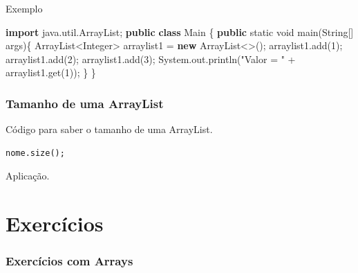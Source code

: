 \documentclass[
]{book}
\newenvironment{Shaded}{\begin{snugshade}}{\end{snugshade}}
\newcommand{\BuiltInTok}[1]{#1}
\newcommand{\DataTypeTok}[1]{\textcolor[rgb]{0.13,0.29,0.53}{#1}}
\newcommand{\DecValTok}[1]{\textcolor[rgb]{0.00,0.00,0.81}{#1}}
\newcommand{\FunctionTok}[1]{\textcolor[rgb]{0.00,0.00,0.00}{#1}}
\newcommand{\ImportTok}[1]{#1}
\newcommand{\KeywordTok}[1]{\textcolor[rgb]{0.13,0.29,0.53}{\textbf{#1}}}
\newcommand{\NormalTok}[1]{#1}
\newcommand{\StringTok}[1]{\textcolor[rgb]{0.31,0.60,0.02}{#1}}
\begin{document}
Exemplo

\begin{Shaded}
\begin{Highlighting}[]
\KeywordTok{import}\ImportTok{ java.util.ArrayList;}
\KeywordTok{public} \KeywordTok{class}\NormalTok{ Main \{}
    \KeywordTok{public} \DataTypeTok{static} \DataTypeTok{void} \FunctionTok{main}\NormalTok{(}\BuiltInTok{String}\NormalTok{[] args)\{}
        \BuiltInTok{ArrayList}\NormalTok{<}\BuiltInTok{Integer}\NormalTok{> arraylist1 = }\KeywordTok{new} \BuiltInTok{ArrayList}\NormalTok{<>();}
\NormalTok{        arraylist1.}\FunctionTok{add}\NormalTok{(}\DecValTok{1}\NormalTok{);}
\NormalTok{        arraylist1.}\FunctionTok{add}\NormalTok{(}\DecValTok{2}\NormalTok{);}
\NormalTok{        arraylist1.}\FunctionTok{add}\NormalTok{(}\DecValTok{3}\NormalTok{);}
        \BuiltInTok{System}\NormalTok{.}\FunctionTok{out}\NormalTok{.}\FunctionTok{println}\NormalTok{(}\StringTok{"Valor = "}\NormalTok{ + arraylist1.}\FunctionTok{get}\NormalTok{(}\DecValTok{1}\NormalTok{));}
\NormalTok{    \}}
\NormalTok{\}}
\end{Highlighting}
\end{Shaded}

\hypertarget{tamanho-de-uma-arraylist}{%
\subsubsection{Tamanho de uma ArrayList}\label{tamanho-de-uma-arraylist}}

Código para saber o tamanho de uma ArrayList.

\begin{verbatim}
nome.size();
\end{verbatim}

Aplicação.

\hypertarget{exercuxedcios-1}{%
\section*{Exercícios}\label{exercuxedcios-1}}

\hypertarget{exercuxedcios-com-arrays}{%
\subsubsection*{Exercícios com Arrays}\label{exercuxedcios-com-arrays}}
\end{document}
